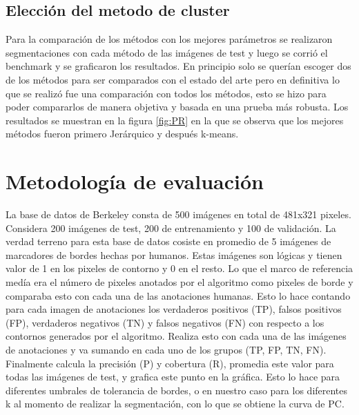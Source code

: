 \documentclass[10pt,twocolumn,letterpaper]{article}
\begin{document}
\subsection{Elección del metodo de cluster}
Para la comparación de los métodos con los mejores parámetros se realizaron segmentaciones con cada método de las imágenes de test y luego se corrió el benchmark y se graficaron los resultados. En principio solo se querían escoger dos de los métodos para ser comparados con el estado del arte pero en definitiva lo que se realizó fue una comparación con todos los métodos, esto se hizo para poder compararlos de manera objetiva y basada en una prueba más robusta. Los resultados se muestran en la figura \ref{fig:PR} en la que se observa que los mejores métodos fueron primero Jerárquico y después k-means. 

\section{Metodología de evaluación}
La base de datos de Berkeley consta de 500 imágenes en total de 481x321 pixeles. Considera 200 imágenes de test, 200 de entrenamiento y 100 de validación. La verdad terreno para esta base de datos cosiste en promedio de 5 imágenes de marcadores de bordes hechas por humanos. Estas imágenes son lógicas y tienen valor de 1 en los pixeles de contorno y 0 en el resto. Lo que el marco de referencia medía era el número de pixeles anotados por el algoritmo como pixeles de borde y comparaba esto con cada una de las anotaciones humanas. Esto lo hace contando para cada imagen de anotaciones los verdaderos positivos (TP), falsos positivos (FP), verdaderos negativos (TN) y falsos negativos (FN) con respecto a los contornos generados por el algoritmo. Realiza esto con cada una de las imágenes de anotaciones y va sumando en cada uno de los grupos (TP, FP, TN, FN). Finalmente calcula la precisión (P) y cobertura (R), promedia este valor para todas las imágenes de test, y grafica este punto en la gráfica. Esto lo hace para diferentes umbrales de tolerancia de bordes, o en nuestro caso para los diferentes k al momento de realizar la segmentación, con lo que se obtiene la curva de PC.\cite{BSDS}
\end{document}
